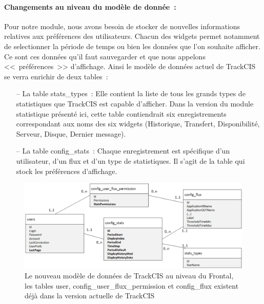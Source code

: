 			\paragraph{Changements au niveau du modèle de donnée~:}
			Pour notre module, nous avons besoin de stocker de nouvelles informations
			relatives aux préférences des utilisateurs. Chacun des widgets permet
			notamment de selectionner la période de temps ou bien les données que l'on
			souhaite afficher. Ce sont ces données qu'il faut sauvegarder et que nous
			appelons <<~préférences~>> d'affichage.
			Ainsi le modèle de données actuel de TrackCIS se verra enrichir de deux
			tables~:
			\begin{itemize}
			  \item[-- La table stats\_types~:] Elle contient la liste de tous les
			  grands types de statistiques que TrackCIS est capable d'afficher. Dans la
			  version du module statistique présenté ici, cette table contiendrait
			  six enregistrements correspondant aux noms des six widgets (Historique,
			  Transfert, Disponibilité, Serveur, Disque, Dernier message).
			  \item[-- La table config\_stats~:] Chaque enregistrement est
			  spécifique d'un utilisateur, d'un flux et d'un type de statistiques. Il
			  s'agit de la table qui stock les préférences d'affichage.
			\end{itemize}
			\begin{figure}[H]
				\centering
				\includegraphics[width=16cm]{../img/part3/modele_donnee.png}
				\caption{\label{modele_donnee} Le nouveau modèle de données de TrackCIS au
				niveau du Frontal, les tables user, config\_user\_flux\_permission et
				config\_flux existent déjà dans la version actuelle de TrackCIS}
			\end{figure}
			
